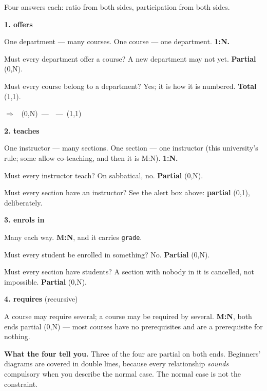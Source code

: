\begin{worked}
Four answers each: ratio from both sides, participation from both sides.

\medskip
\textbf{1.  offers }
\begin{tight}
  \item One department --- many courses. One course --- one department.
        \textbf{1:N.}
  \item Must every department offer a course? A new department may not yet.
        \textbf{Partial} (0,N).
  \item Must every course belong to a department? Yes; it is how it is
        numbered. \textbf{Total} (1,1).
\end{tight}
$\Rightarrow$ ~(0,N)~---~~---~(1,1)~

\medskip
\textbf{2.  teaches }
\begin{tight}
  \item One instructor --- many sections. One section --- one instructor
        (this university's rule; some allow co-teaching, and then it is M:N).
        \textbf{1:N.}
  \item Must every instructor teach? On sabbatical, no. \textbf{Partial} (0,N).
  \item Must every section have an instructor? See the alert box above:
        \textbf{partial} (0,1), deliberately.
\end{tight}

\medskip
\textbf{3.  enrols in }
\begin{tight}
  \item Many each way. \textbf{M:N}, and it carries \texttt{grade}.
  \item Must every student be enrolled in something? No. \textbf{Partial} (0,N).
  \item Must every section have students? A section with nobody in it is
        cancelled, not impossible. \textbf{Partial} (0,N).
\end{tight}

\medskip
\textbf{4.  requires } (recursive)
\begin{tight}
  \item A course may require several; a course may be required by several.
        \textbf{M:N}, both ends partial (0,N) --- most courses have no
        prerequisites and are a prerequisite for nothing.
\end{tight}

\medskip
\textbf{What the four tell you.} Three of the four are partial on both ends.
Beginners' diagrams are covered in double lines, because every relationship
\emph{sounds} compulsory when you describe the normal case. The normal case is
not the constraint.
\end{worked}

